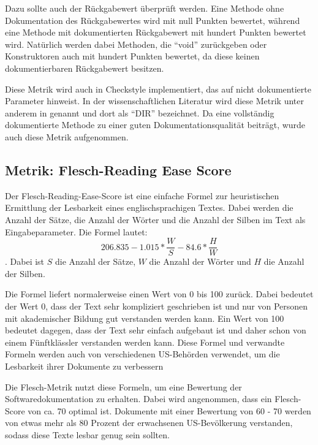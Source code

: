  Dazu sollte auch der Rückgabewert überprüft werden. Eine Methode ohne Dokumentation des Rückgabewertes wird mit null Punkten bewertet, während eine Methode mit dokumentierten Rückgabewert mit hundert Punkten bewertet wird. Natürlich werden dabei Methoden, die \enquote{void} zurückgeben oder Konstruktoren auch mit hundert Punkten bewertet, da diese keinen dokumentierbaren Rückgabewert besitzen. 
 
 Diese Metrik wird auch in Checkstyle implementiert, das auf nicht dokumentierte Parameter hinweist. In der wissenschaftlichen Literatur wird diese Metrik unter anderem in \cite[S. 5]{HowDocumentationEvolvesoverTime} genannt und dort als \enquote{DIR} bezeichnet. Da eine vollständig dokumentierte Methode zu einer guten Dokumentationsqualität beiträgt, wurde auch diese Metrik aufgenommen.


\subsection{Metrik: Flesch-Reading Ease Score}\label{chapter:metrics_flesh}
Der Flesch-Reading-Ease-Score\cite[S. 21]{ThePrinciplesofReadability} ist eine einfache Formel zur heuristischen Ermittlung der Lesbarkeit eines englischsprachigen Textes. Dabei werden die Anzahl der Sätze, die Anzahl der Wörter und die Anzahl der Silben im Text als Eingabeparameter. Die Formel lautet:
\begin{equation}
   206.835-1.015*\frac{W}{S}-84.6*\frac{H}{W}
\end{equation}. Dabei ist $S$ die Anzahl der Sätze, $W$ die Anzahl der Wörter und $H$ die Anzahl der Silben. 

Die Formel liefert normalerweise einen Wert von 0 bis 100 zurück. Dabei bedeutet der Wert 0, dass der Text sehr kompliziert geschrieben ist und nur von Personen mit akademischer Bildung gut verstanden werden kann. Ein Wert von 100 bedeutet dagegen, dass der Text sehr einfach aufgebaut ist und daher schon von einem Fünftklässler verstanden werden kann. Diese Formel und verwandte Formeln werden auch von verschiedenen US-Behörden verwendet, um die Lesbarkeit ihrer Dokumente zu verbessern \cite[S. 72]{AutomaticQualityAssessmentofSourceCodeComments:TheJavadocMiner}

Die Flesch-Metrik nutzt diese Formeln, um eine Bewertung der Softwaredokumentation zu erhalten. Dabei wird angenommen, dass ein Flesch-Score von ca. 70 optimal ist. Dokumente mit einer Bewertung von 60 - 70 werden von etwas mehr als 80 Prozent der erwachsenen US-Bevölkerung verstanden, sodass diese Texte lesbar genug sein sollten.

